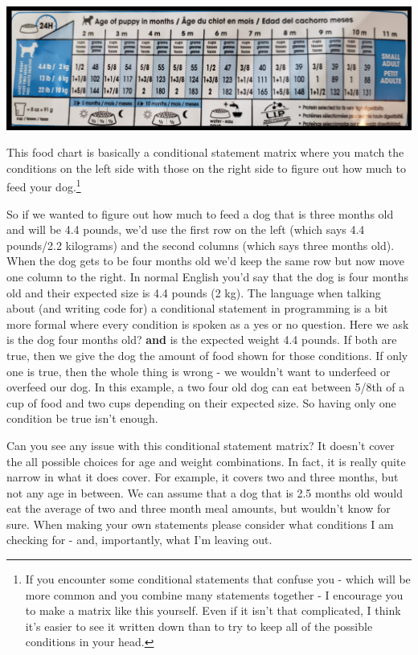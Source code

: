 \documentclass[
]{krantz}
\begin{document}
\includegraphics{images/dog_food.PNG}

This food chart is basically a conditional statement matrix where you match the conditions on the left side with those on the right side to figure out how much to feed your dog.\footnote{If you encounter some conditional statements that confuse you - which will be more common and you combine many statements together - I encourage you to make a matrix like this yourself. Even if it isn't that complicated, I think it's easier to see it written down than to try to keep all of the possible conditions in your head.}

So if we wanted to figure out how much to feed a dog that is three months old and will be 4.4 pounds, we'd use the first row on the left (which says 4.4 pounds/2.2 kilograms) and the second columns (which says three months old). When the dog gets to be four months old we'd keep the same row but now move one column to the right. In normal English you'd say that the dog is four months old and their expected size is 4.4 pounds (2 kg). The language when talking about (and writing code for) a conditional statement in programming is a bit more formal where every condition is spoken as a yes or no question. Here we ask is the dog four months old? \textbf{and} is the expected weight 4.4 pounds. If both are true, then we give the dog the amount of food shown for those conditions. If only one is true, then the whole thing is wrong - we wouldn't want to underfeed or overfeed our dog. In this example, a two four old dog can eat between 5/8th of a cup of food and two cups depending on their expected size. So having only one condition be true isn't enough.

Can you see any issue with this conditional statement matrix? It doesn't cover the all possible choices for age and weight combinations. In fact, it is really quite narrow in what it does cover. For example, it covers two and three months, but not any age in between. We can assume that a dog that is 2.5 months old would eat the average of two and three month meal amounts, but wouldn't know for sure. When making your own statements please consider what conditions I am checking for - and, importantly, what I'm leaving out.
\end{document}

